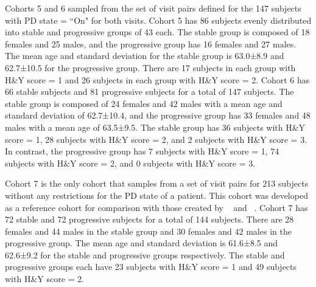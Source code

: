 \documentclass[10pt,letterpaper]{article}
\begin{document}
Cohorts 5 and 6 sampled from the set of visit pairs defined for the 147 subjects with PD state = ``On" for both visits. Cohort 5 has 86 subjects evenly distributed into stable 
and progressive groups of 43 each. The stable group is composed of 18 females and 25 males, and the progressive group has 16 females and 27 males. The mean age and standard 
deviation for the stable group is 63.0±8.9 and 62.7±10.5 for the progressive group. There are 17 subjects in each group with H\&Y score = 1 and 26 subjects in each group 
with H\&Y score = 2. Cohort 6 has 66 stable subjects and 81 progressive subjects for a total of 147 subjects. The stable group is composed of 24 females and 42 males with a mean 
age and standard deviation of 62.7±10.4, and the progressive group has 33 females and 48 males with a mean age of 63.5±9.5. The stable group has 36 subjects with H\&Y score = 1, 28 subjects 
with H\&Y score = 2, and 2 subjects with H\&Y score = 3. In contrast, the progressive group has 7 subjects with H\&Y score = 1, 74 subjects with H\&Y score = 2, and 0 subjects with 
H\&Y score = 3. 

Cohort 7 is the only cohort that samples from a set of visit pairs for 213 subjects without any restrictions for the PD state of a patient. This cohort was developed as a 
reference cohort for comparison with those created by ~\cite{shu2021predicting} and ~\cite{Arafe2023.05.05.539590}. Cohort 7 has 72 stable and 72 progressive subjects for a total 
of 144 subjects. There are 28 females and 44 males in the stable group and 30 females and 42 males in the progressive group. The mean age and standard deviation is 61.6±8.5 and 
62.6±9.2 for the stable and progressive groups respectively. The stable and progressive groups each have 23 subjects with H\&Y score = 1 and 49 subjects with H\&Y score = 2. 
\end{document}
